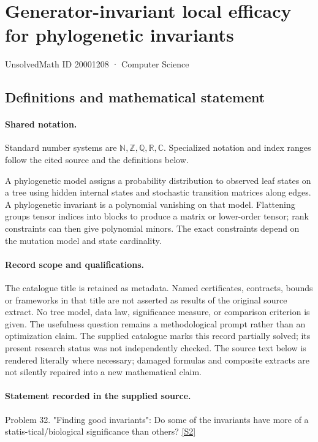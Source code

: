 \documentclass[11pt]{article}
\newcommand{\sref}[2]{\hyperlink{source:#1:#2}{[S#2]}}
\begin{document}
\setcounter{section}{20001207}
\section{Generator-invariant local efficacy for phylogenetic invariants}\label{20001208}
{\small\sffamily UnsolvedMath ID 20001208 · Computer Science}
\subsection{Definitions and mathematical statement}

\paragraph{Shared notation.}Standard number systems are $\mathbb N,\mathbb Z,\mathbb Q,\mathbb R,\mathbb C$. Specialized notation and index ranges follow the cited source and the definitions below.


A phylogenetic model assigns a probability distribution to observed leaf states on a tree using hidden internal states and stochastic transition matrices along edges. A phylogenetic invariant is a polynomial vanishing on that model. Flattening groups tensor indices into blocks to produce a matrix or lower-order tensor; rank constraints can then give polynomial minors. The exact constraints depend on the mutation model and state cardinality.
\paragraph{Record scope and qualifications.}
The catalogue title is retained as metadata. Named certificates, contracts, bounds or frameworks in that title are not asserted as results of the original source extract.
No tree model, data law, significance measure, or comparison criterion is given. The usefulness question remains a methodological prompt rather than an optimization claim. The supplied catalogue marks this record partially solved; its present research status was not independently checked.
The source text below is rendered literally where necessary; damaged formulas and composite extracts are not silently repaired into a new mathematical claim.
\paragraph{Statement recorded in the supplied source.}
Problem 32. "Finding good invariants": Do some of the invariants have more of a statis-tical/biological significance than others? \sref{20001208}{2}
\end{document}

